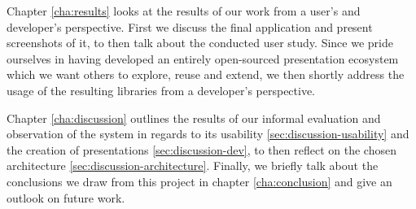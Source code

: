 Chapter \ref{cha:results} looks at the results of our work from a user's and developer's perspective. First we discuss the final application and present screenshots of it, to then talk about the conducted user study. Since we pride ourselves in having developed an entirely open-sourced presentation ecosystem which we want others to explore, reuse and extend, we then shortly address the usage of the resulting libraries from a developer's perspective.

Chapter \ref{cha:discussion} outlines the results of our informal evaluation and observation of the system in regards to its usability \ref{sec:discussion-usability} and the creation of presentations \ref{sec:discussion-dev}, to then reflect on the chosen architecture \ref{sec:discussion-architecture}.
Finally, we briefly talk about the conclusions we draw from this project in chapter \ref{cha:conclusion} and  give an outlook on future work.
